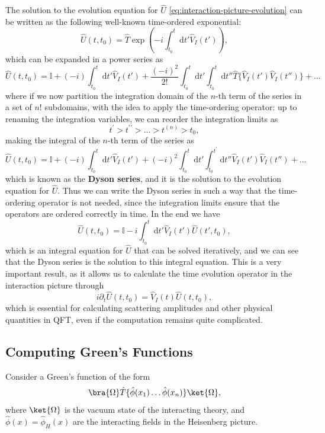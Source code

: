 The solution to the evolution equation for \(\hat{U}\) \eqref{eq:interaction-picture-evolution} can be written as the following well-known time-ordered exponential:
\[
    \hat{U}(t,t_0) = \hat{T} \exp \left( -i \int_{t_0}^t \mathrm{d} t' \hat{V}_I (t') \right),
\]
which can be expanded in a power series as
\[
    \hat{U}(t,t_0) = \mathbb{I} + (-i) \int_{t_0}^t \mathrm{d} t' \hat{V}_I (t') + \frac{(-i)^2}{2!} \int_{t_0}^t \mathrm{d} t' \int_{t_0}^{t} \mathrm{d} t'' \hat{T} \{\hat{V}_I (t') \hat{V}_I (t'')\} + \dots
\]
where if we now partition the integration domain of the \(n\)-th term of the series in a set of \(n!\) subdomains, with the idea to apply the time-ordering operator: up to renaming the integration variables, we can reorder the integration limits as
\[
    t^{\prime} > t^{\prime \prime} > \dots > t^{(n)} > t_0,
\]
making the integral of the \(n\)-th term of the series as
\[
    \hat{U}(t,t_0) = \mathbb{I} + (-i) \int_{t_0}^t \mathrm{d} t' \hat{V}_I (t') + (-i)^2 \int_{t_0}^t \mathrm{d} t' \int_{t_0}^{t^{\prime}} \mathrm{d} t'' \hat{V}_I (t') \hat{V}_I (t'') + \dots
\]
which is known as the \textbf{Dyson series}, and it is the solution to the evolution equation for \(\hat{U}\). Thus we can write the Dyson series in such a way that the time-ordering operator is not needed, since the integration limits ensure that the operators are ordered correctly in time. In the end we have
\[
    \hat{U}(t,t_0) = \mathbb{I} -i \int_{t_0}^t \mathrm{d} t' \hat{V}_I (t') \hat{U}(t',t_0),
\]
which is an integral equation for \(\hat{U}\) that can be solved iteratively, and we can see that the Dyson series is the solution to this integral equation. This is a very important result, as it allows us to calculate the time evolution operator in the interaction picture through
\[
    i \partial_t \hat{U}(t,t_0) = \hat{V}_I (t) \hat{U}(t,t_0),
\]
which is essential for calculating scattering amplitudes and other physical quantities in QFT, even if the computation remains quite complicated.

\subsection{Computing Green's Functions}

Consider a Green's function of the form
\[
    \bra{\Omega} \hat{T} \{ \hat{\phi} (x_1) \dots \hat{\phi} (x_n) \} \ket{\Omega},
\]
where \(\ket{\Omega}\) is the vacuum state of the interacting theory, and \(\hat{\phi} (x) = \hat{\phi}_H (x)\) are the interacting fields in the Heisenberg picture.

